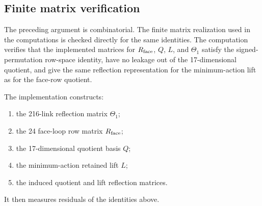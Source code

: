 \documentclass[10pt]{article}
\begin{document}
\subsection{Finite matrix verification}

The preceding argument is combinatorial.  The finite matrix realization used in the computations is checked directly for the same identities.  The computation verifies that the implemented matrices for \(R_{\rm face}\), \(Q\), \(L\), and \(\Theta_1\) satisfy the signed-permutation row-space identity, have no leakage out of the 17-dimensional quotient, and give the same reflection representation for the minimum-action lift as for the face-row quotient.

The implementation constructs:

\begin{enumerate}[leftmargin=*]
\item the 216-link reflection matrix \(\Theta_1\);
\item the 24 face-loop row matrix \(R_{\rm face}\);
\item the 17-dimensional quotient basis \(Q\);
\item the minimum-action retained lift \(L\);
\item the induced quotient and lift reflection matrices.
\end{enumerate}

It then measures residuals of the identities above.
\end{document}

